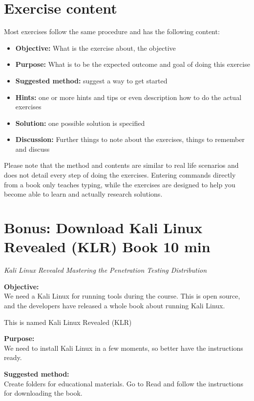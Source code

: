 \documentclass[a4paper,11pt,notitlepage]{report}
\begin{document}
\chapter*{\color{titlecolor}Exercise content}

Most exercises follow the same procedure and has the following content:
\begin{itemize}
\item {\bf Objective:} What is the exercise about, the objective
\item {\bf Purpose:} What is to be the expected outcome and goal of doing this exercise
\item {\bf Suggested method:} suggest a way to get started
\item {\bf Hints:} one or more hints and tips or even description how to
do the actual exercises
\item {\bf Solution:} one possible solution is specified
\item {\bf Discussion:} Further things to note about the exercises, things to remember and discuss
\end{itemize}

Please note that the method and contents are similar to real life scenarios and does not detail every step of doing the exercises. Entering commands directly from a book only teaches typing, while the exercises are designed to help you become able to learn and actually research solutions.


\chapter{Bonus: Download Kali Linux Revealed (KLR) Book 10 min}
\label{ex:downloadKLR}



\emph{Kali Linux Revealed  Mastering the Penetration Testing Distribution}


{\bf Objective:}\\
We need a Kali Linux for running tools during the course. This is open source, and the developers have released a whole book about running Kali Linux.

This is named Kali Linux Revealed (KLR)

{\bf Purpose:}\\
We need to install Kali Linux in a few moments, so better have the instructions ready.

{\bf Suggested method:}\\
Create folders for educational materials. Go to 
Read and follow the instructions for downloading the book.
\end{document}
